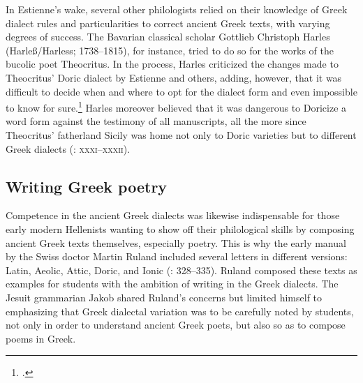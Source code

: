 In Estienne’s wake, several other philologists relied on their knowledge of Greek dialect rules and particularities to correct ancient Greek texts, with varying degrees of success. The Bavarian classical scholar Gottlieb Christoph Harles (Harleß/Harless; 1738–1815), for instance, tried to do so for the works of the bucolic poet Theocritus. In the process, Harles criticized the changes made to Theocritus’ Doric dialect by Estienne and others, adding, however, that it was difficult to decide when and where to opt for the dialect form and even impossible to know for sure.\footnote{\citet[\textsc{xxii–xxiv}]{Harles1780}.} Harles moreover believed that it was dangerous to Doricize a word form against the testimony of all manuscripts, all the more since Theocritus’ fatherland Sicily was home not only to Doric varieties but to different Greek dialects (\citealt{Harles1780}: \textsc{xxxi–xxxii}).

\subsection{Writing Greek poetry}

Competence in the ancient Greek dialects was likewise indispensable for those early modern Hellenists wanting to show off their philological skills by composing ancient Greek texts themselves, especially poetry. This is why the early manual by the Swiss doctor Martin Ruland included several letters in different versions: Latin, Aeolic, Attic, Doric, and Ionic (\citealt{Ruland1556}: 328–335). Ruland composed these texts as examples for students with the ambition of writing in the Greek dialects. The Jesuit grammarian Jakob \citet[35]{Gretser1593} shared Ruland’s concerns but limited himself to emphasizing that Greek dialectal variation was to be carefully noted by students, not only in order to understand ancient Greek poets, but also so as to compose poems in Greek.

